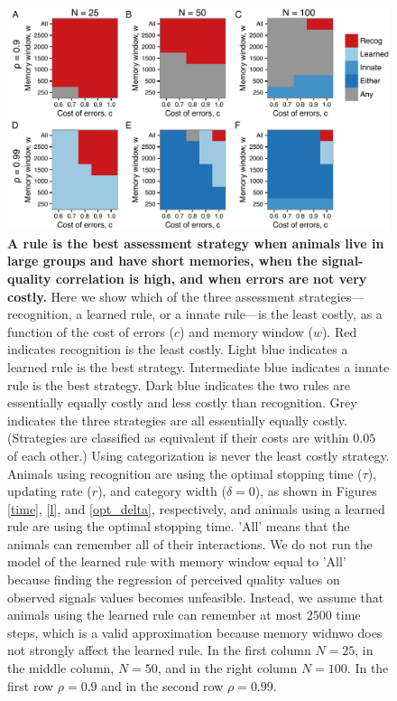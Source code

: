 \begin{figure}
\includegraphics[width=6.85in]{figures/best_type_of_learning.pdf}
\caption{\sffamily\small\textbf{A rule is the best assessment strategy when animals live in large groups and have short memories, when the signal-quality correlation is high, and when errors are not very costly.} Here we show which of the three assessment strategies---recognition, a learned rule, or a innate rule---is the least costly, as a function of the cost of errors ($c$) and memory window ($w$). Red indicates recognition is the least costly. Light blue indicates a learned rule is the best strategy. Intermediate blue indicates a innate rule is the best strategy. Dark blue indicates the two rules are essentially equally costly and less costly than recognition. Grey indicates the three strategies are all essentially equally costly. (Strategies are classified as equivalent if their costs are within $0.05$ of each other.) Using categorization is never the least costly strategy. Animals using recognition are using the optimal stopping time ($\tau$), updating rate ($r$), and category width ($\delta=0$), as shown in Figures \ref{time}, \ref{l}, and \ref{opt_delta}, respectively, and animals using a learned rule are using the optimal stopping time. 'All' means that the animals can remember all of their interactions. We do not run the model of the learned rule with memory window equal to 'All' because finding the regression of perceived quality values on observed signals values becomes unfeasible. Instead, we assume that animals using the learned rule can remember at most $2500$ time steps, which is a valid approximation because memory widnwo does not strongly affect the learned rule. In the first column $N=25$, in the middle column, $N=50$, and in the right column $N=100$. In the first row $\rho=0.9$ and in the second row $\rho=0.99$.}
\label{best}
\end{figure}

